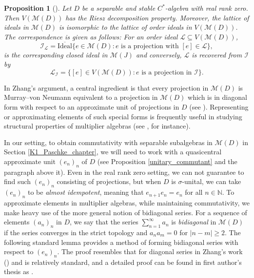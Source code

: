 \documentclass[reqno]{amsart}
\newtheorem{prop}[thm]{Proposition}
\theoremstyle{definition}
\theoremstyle{remark}
\numberwithin{equation}{section}
\theoremstyle{definition}
\newcommand{\calM}{\mathcal{M}}
\newcommand{\calL}{\mathcal{L}}
\newcommand{\calI}{\mathcal{I}}
\begin{document}
\begin{prop}[{\cite[Theorem 2.3]{Riesz-dec}}]
\label{ideal_corr} 
Let $D$ be a separable and stable $C^*$-algebra with real rank zero. Then $V(\calM(D))$ has the Riesz decomposition property. Moreover, the lattice of ideals in $\calM(D)$ is isomorphic to the lattice of order ideals in $V(\calM(D))$. The correspondence is given as follows: For an order ideal $\calL \subseteq V(\calM(D))$, 
\begin{equation} \label{ideal-def}
\calI_{\calL} = \overline{\mathrm{Ideal}} \{e\in \calM(D):e \text{ is a projection with } [e]\in \calL\}, 
\end{equation} 
is the corresponding closed ideal in $\calM(J)$ and conversely, $\calL$ is recovered from $\calI$ by 
\begin{equation} \label{order_ideal-def}
\calL_{\calI} = \{[e]\in V(\calM(D)): e\text{ is a projection in } \calI\}. 
\end{equation}  
\end{prop} 

In Zhang's argument, a central ingredient is that every projection in $\calM(D)$ is Murray--von Neumann equivalent to a projection in $\calM(D)$ which is in diagonal form with respect to an approximate unit of projections in $D$ (see \cite[Corollary 2.1]{Riesz-dec}). Representing or approximating elements of such special forms is frequently useful in studying structural properties of multiplier algebras (see \cite{Zhang_RR0_Calkin, RR-LHX, Zhang_1991}, for instance). 

In our setting,  to obtain commutativity with separable subalgebras in $\calM(D)$ in Section \ref{K1_Paschke_chapter}, we will need to work with a quasicentral approximate unit $(e_{n})_{n}$ of $D$ (see Proposition \ref{unitary_commutant} and the paragraph above it). Even in the real rank zero setting, we can not guarantee to find such $(e_{n})_{n}$ consisting of projections, but when $D$ is $\sigma$-unital, we can take $(e_{n})_{n}$ to be \emph{almost idempotent}, meaning that $e_{n+1}e_{n} = e_{n}$ for all $n\in \mathbb{N}$. To approximate elements in multiplier algebras, while maintaining commutativity, we make heavy use of the more general notion of bidiagonal series. For a sequence of elements $(a_{n})_{n}$ in $D$, we say that the series $\sum_{n=1}^{\infty} a_{n}$ is \emph{bidiagonal} in $\calM(D)$ if the series converges in the strict topology and $a_{n} a_{m} = 0$ for $|n-m|\geq 2$. The following standard lemma provides a method of forming bidiagonal series with respect to $(e_{n})_{n}$. The proof resembles that for diagonal series in Zhang's work (\cite[Proposition 1.7]{Zhang_1991}) and is relatively standard, and a detailed proof can be found in first author's thesis  as \cite[Lemma 2.9.11]{Hua_thesis}. 
\end{document}
